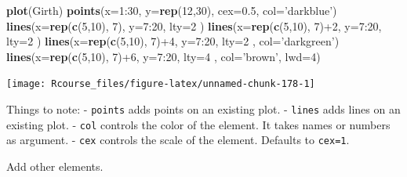 \documentclass[]{book}
\newenvironment{Shaded}{\begin{snugshade}}{\end{snugshade}}
\newcommand{\KeywordTok}[1]{\textcolor[rgb]{0.13,0.29,0.53}{\textbf{{#1}}}}
\newcommand{\DataTypeTok}[1]{\textcolor[rgb]{0.13,0.29,0.53}{{#1}}}
\newcommand{\DecValTok}[1]{\textcolor[rgb]{0.00,0.00,0.81}{{#1}}}
\newcommand{\FloatTok}[1]{\textcolor[rgb]{0.00,0.00,0.81}{{#1}}}
\newcommand{\StringTok}[1]{\textcolor[rgb]{0.31,0.60,0.02}{{#1}}}
\newcommand{\NormalTok}[1]{{#1}}
\theoremstyle{definition}
\theoremstyle{definition}
\theoremstyle{remark}
\begin{document}
\begin{Shaded}
\begin{Highlighting}[]
\KeywordTok{plot}\NormalTok{(Girth)}
\KeywordTok{points}\NormalTok{(}\DataTypeTok{x=}\DecValTok{1}\NormalTok{:}\DecValTok{30}\NormalTok{, }\DataTypeTok{y=}\KeywordTok{rep}\NormalTok{(}\DecValTok{12}\NormalTok{,}\DecValTok{30}\NormalTok{), }\DataTypeTok{cex=}\FloatTok{0.5}\NormalTok{, }\DataTypeTok{col=}\StringTok{'darkblue'}\NormalTok{)}
\KeywordTok{lines}\NormalTok{(}\DataTypeTok{x=}\KeywordTok{rep}\NormalTok{(}\KeywordTok{c}\NormalTok{(}\DecValTok{5}\NormalTok{,}\DecValTok{10}\NormalTok{), }\DecValTok{7}\NormalTok{), }\DataTypeTok{y=}\DecValTok{7}\NormalTok{:}\DecValTok{20}\NormalTok{, }\DataTypeTok{lty=}\DecValTok{2} \NormalTok{)}
\KeywordTok{lines}\NormalTok{(}\DataTypeTok{x=}\KeywordTok{rep}\NormalTok{(}\KeywordTok{c}\NormalTok{(}\DecValTok{5}\NormalTok{,}\DecValTok{10}\NormalTok{), }\DecValTok{7}\NormalTok{)+}\DecValTok{2}\NormalTok{, }\DataTypeTok{y=}\DecValTok{7}\NormalTok{:}\DecValTok{20}\NormalTok{, }\DataTypeTok{lty=}\DecValTok{2} \NormalTok{)}
\KeywordTok{lines}\NormalTok{(}\DataTypeTok{x=}\KeywordTok{rep}\NormalTok{(}\KeywordTok{c}\NormalTok{(}\DecValTok{5}\NormalTok{,}\DecValTok{10}\NormalTok{), }\DecValTok{7}\NormalTok{)+}\DecValTok{4}\NormalTok{, }\DataTypeTok{y=}\DecValTok{7}\NormalTok{:}\DecValTok{20}\NormalTok{, }\DataTypeTok{lty=}\DecValTok{2} \NormalTok{, }\DataTypeTok{col=}\StringTok{'darkgreen'}\NormalTok{)}
\KeywordTok{lines}\NormalTok{(}\DataTypeTok{x=}\KeywordTok{rep}\NormalTok{(}\KeywordTok{c}\NormalTok{(}\DecValTok{5}\NormalTok{,}\DecValTok{10}\NormalTok{), }\DecValTok{7}\NormalTok{)+}\DecValTok{6}\NormalTok{, }\DataTypeTok{y=}\DecValTok{7}\NormalTok{:}\DecValTok{20}\NormalTok{, }\DataTypeTok{lty=}\DecValTok{4} \NormalTok{, }\DataTypeTok{col=}\StringTok{'brown'}\NormalTok{, }\DataTypeTok{lwd=}\DecValTok{4}\NormalTok{)}
\end{Highlighting}
\end{Shaded}

\texttt{[image: Rcourse\_files/figure-latex/unnamed-chunk-178-1]}

Things to note: - \texttt{points} adds points on an existing plot. -
\texttt{lines} adds lines on an existing plot. - \texttt{col} controls
the color of the element. It takes names or numbers as argument. -
\texttt{cex} controls the scale of the element. Defaults to
\texttt{cex=1}.

Add other elements.
\end{document}
